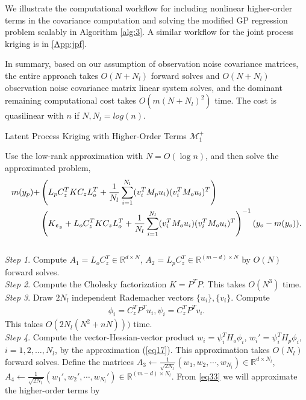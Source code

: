\documentclass[article,ij4uq]{ij4uq}              %
\begin{document}
We illustrate the computational workflow for including nonlinear higher-order terms in the covariance computation and solving the modified GP regression problem scalably in Algorithm \ref{alg:3}. A similar workflow for the joint process kriging is in \ref{App:jpf}.

\par In summary, based on our assumption of observation noise covariance matrices, the entire approach takes $O(N+N_{l})$ forward solves and $O(N+N_{l})$ observation noise covariance matrix linear system solves, and the dominant remaining computational cost takes $O(m(N+N_{l})^{2})$ time. The cost is quasilinear with $n$ if $N,N_{l}=log(n)$.

\begin{algorithm}[t!]
\caption{Latent Process Kriging with Higher-Order Terms $\mathcal{M}_{1}^{+}$}\label{alg:3}
Use the low-rank approximation with $N=O(\log{n})$, and then solve the approximated problem,
\begin{align}
    m(y_{p})+&\left(L_{p}C_{z}^{T}KC_{z}L_{o}^{T}+\frac{1}{N_{l}}\sum_{i=1}^{N_{l}}(v_{i}^{T}M_{p}u_{i})(v_{i}^{T}M_{o}u_{i})^{T}\right)\notag\\
    &\left(K_{\epsilon_{y}}+L_{o}C_{z}^{T}KC_{z}L_{o}^{T}+\frac{1}{N_{l}}\sum_{i=1}^{N_{l}}(v_{i}^{T}M_{o}u_{i})(v_{i}^{T}M_{o}u_{i})^{T}\right)^{-1}(y_{o}-m(y_{o})).\label{eq34}
\end{align}\\
\textit{Step 1}. Compute $A_{1}=L_{o}C_{z}^{T}\in\mathbb{R}^{d\times N}$, $A_{2}=L_{p}C_{z}^{T}\in\mathbb{R}^{(m-d)\times N}$ by $O(N)$ forward solves.\\
\textit{Step 2}. Compute the Cholesky factorization $K=P^{T}P$. This takes $O(N^{3})$ time.\\
\textit{Step 3}. Draw $2N_{l}$ independent Rademacher vectors $\{u_{i}\},\{v_{i}\}$. Compute
\begin{align}
    \phi_{i}=C_{z}^{T}P^{T}u_{i}, \psi_{i}=C_{z}^{T}P^{T}v_{i}.\label{eq35}
\end{align}
This takes $O(2N_{l}(N^2+nN)))$ time.\\
\textit{Step 4}. Compute the vector-Hessian-vector product $w_{i}=\psi_{i}^{T}H_{o}\phi_{i}$, $w_{i}'=\psi_{i}^{T}H_{p}\phi_{i}$, $i=1,2,\ldots,N_l$, by the approximation (\ref{eq17}). This approximation takes $O(N_{l})$ forward solves. Define the matrices $A_{3}\gets \frac{1}{\sqrt{2N_{l}}}(w_{1},w_{2},\cdots,w_{N_{l}})\in\mathbb{R}^{d\times N_{l}}$, $A_{4}\gets \frac{1}{\sqrt{2N_{l}}}(w_{1}',w_{2}',\cdots,w_{N_{l}}')\in\mathbb{R}^{(m-d)\times N_{l}}$. From \eqref{eq33} we will approximate the higher-order terms by

\end{algorithm}
\end{document}

